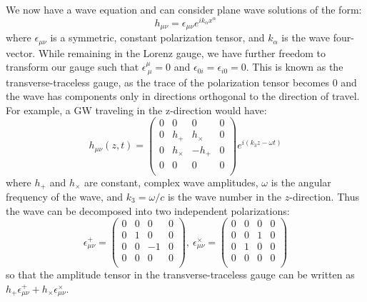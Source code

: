 We now have a wave equation and can consider plane wave solutions of the form:
\begin{equation}
    h_{\mu\nu} = \epsilon_{\mu\nu} e^{i k_\alpha x^\alpha}
\end{equation}
where $\epsilon_{\mu\nu}$ is a symmetric, constant polarization tensor, and $k_\alpha$ is the wave four-vector.
While remaining in the Lorenz gauge, we have further freedom to transform our gauge such that $\epsilon^\mu_{\ \mu} = 0$ and $\epsilon_{0i} = \epsilon_{i0} = 0$.
This is known as the transverse-traceless gauge, as the trace of the polarization tensor becomes 0 and the wave has components only in directions orthogonal to the direction of travel.
For example, a GW traveling in the z-direction would have:
\begin{equation}
    h_{\mu\nu} (z, t) = 
    \begin{pmatrix}
        0 & 0 & 0 & 0 \\
        0 & h_+ & h_\times & 0 \\
        0 & h_\times & -h_+ & 0 \\
        0 & 0 & 0 & 0 \\
    \end{pmatrix}
    e^{i(k_3 z - \omega t)}
\end{equation}
where $h_+$ and $h_\times$ are constant, complex wave amplitudes, $\omega$ is the angular frequency of the wave, and $k_3 = \omega/c$ is the wave number in the $z$-direction.
Thus the wave can be decomposed into two independent polarizations:
\begin{equation}
    \epsilon^+_{\mu\nu} = 
    \begin{pmatrix}
        0 & 0 & 0 & 0 \\
        0 & 1 & 0 & 0 \\
        0 & 0 & -1 & 0 \\
        0 & 0 & 0 & 0\\
    \end{pmatrix},\ 
    \epsilon^\times_{\mu\nu} =
    \begin{pmatrix}
        0 & 0 & 0 & 0 \\
        0 & 0 & 1 & 0 \\
        0 & 1 & 0 & 0 \\
        0 & 0 & 0 & 0\\
    \end{pmatrix}
\end{equation}
so that the amplitude tensor in the transverse-traceless gauge can be written as $h_+\epsilon^+_{\mu\nu} + h_\times\epsilon^\times_{\mu\nu}$.

